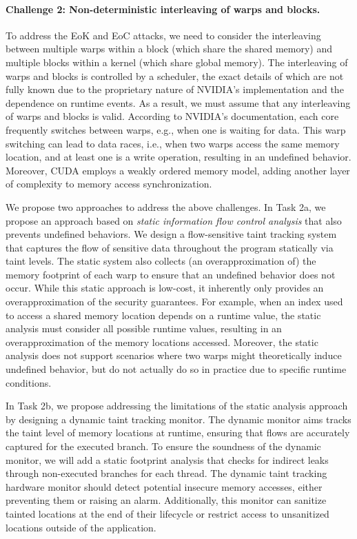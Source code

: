 \paragraph{Challenge 2: Non-deterministic interleaving of warps and blocks.}
To address the EoK and EoC attacks, we need to consider the interleaving between multiple warps within a block (which share the shared memory) and multiple blocks within a kernel (which share global memory).
%
The interleaving of warps and blocks is controlled by a scheduler, the exact details of which are not fully known due to the proprietary nature of NVIDIA's implementation and the dependence on runtime events.
%
As a result, we must assume that any interleaving of warps and blocks is valid. 
% 
According to NVIDIA's documentation, each core frequently switches between warps, e.g., when one is waiting for data. 
%
This warp switching can lead to data races, i.e., when two warps access the same memory location, and at least one is a write operation, resulting in an undefined behavior.
%
Moreover, CUDA employs a weakly ordered memory model, adding another layer of complexity to memory access synchronization.

%
% 


We propose two approaches to address the above challenges.
%
In Task 2a, we propose an approach based on \emph{static information flow control analysis} that also prevents undefined behaviors.
%
We design a flow-sensitive taint tracking system that captures the flow of sensitive data throughout the program statically via taint levels. 
%
The static system also collects (an overapproximation of) the memory footprint of each warp to ensure that an undefined behavior does not occur.
%
While this static approach is low-cost, it inherently only provides an overapproximation of the security guarantees. 
% 
For example, when an index used to access a shared memory location depends on a runtime value, the static analysis must consider all possible runtime values, resulting in an overapproximation of the memory locations accessed.
%
Moreover, the static analysis does not support scenarios where two warps might theoretically induce undefined behavior, but do not actually do so in practice due to specific runtime conditions.

In Task 2b, we propose addressing the limitations of the static analysis approach by designing a dynamic taint tracking monitor.
% 
The dynamic monitor aims tracks the taint level of memory locations at runtime, ensuring that flows are accurately captured for the executed branch.
%
To ensure the soundness of the dynamic monitor, we will add a static footprint analysis that checks for indirect leaks through non-executed branches for each thread. 
% 
The dynamic taint tracking hardware monitor should detect potential insecure memory accesses, either preventing them or raising an alarm.
% 
Additionally, this monitor can sanitize tainted locations at the end of their lifecycle or restrict access to unsanitized locations outside of the application.

